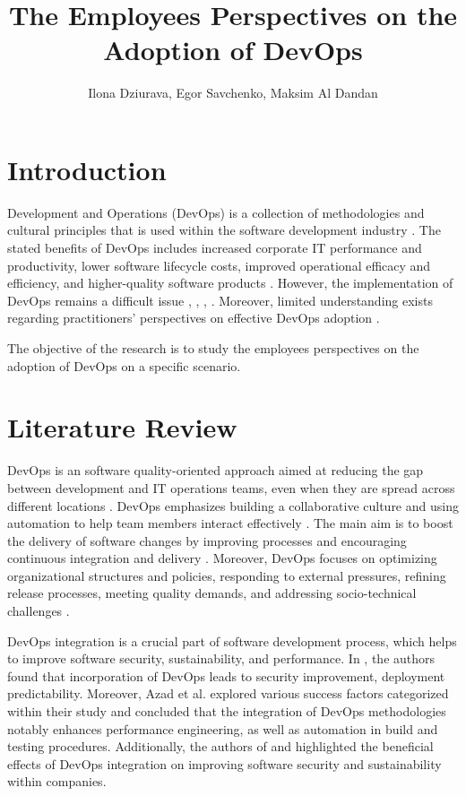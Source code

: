 \documentclass[oneside,final,12pt,a4paper]{extreport}
\title{The Employees Perspectives on the Adoption of DevOps}
\author{Ilona Dziurava, Egor Savchenko, Maksim Al Dandan}
\affil{Innopolis University}
\begin{document}
\maketitle

\newpage


\section{Introduction}

Development and Operations (DevOps) is a collection of methodologies and cultural principles that is used within the software development industry \cite{int1}. The stated benefits of DevOps includes increased corporate IT performance and productivity, lower software lifecycle costs, improved operational efficacy and efficiency, and higher-quality software products \cite{int1}. However, the implementation of DevOps remains a difficult issue \cite{int2}, \cite{8}, \cite{20}, \cite{14}. Moreover, limited understanding exists regarding practitioners' perspectives on effective DevOps adoption \cite{10}.

The objective of the research is to study the employees perspectives on the adoption of DevOps on a specific scenario.

\section{Literature Review}

DevOps is an software quality-oriented approach aimed at reducing the gap between development and IT operations teams, even when they are spread across different locations \cite{17}. DevOps emphasizes building a collaborative culture and using automation to help team members interact effectively \cite{7}. The main aim is to boost the delivery of software changes by improving processes and encouraging continuous integration and delivery \cite{11}. Moreover, DevOps focuses on optimizing organizational structures and policies, responding to external pressures, refining release processes, meeting quality demands, and addressing socio-technical challenges \cite{7}.

DevOps integration is a crucial part of software development process, which helps to improve software security, sustainability, and performance. In \cite{7}, the authors found that incorporation of DevOps leads to security improvement, deployment predictability. Moreover, Azad et al. \cite{9} explored various success factors categorized within their study and concluded that the integration of DevOps methodologies notably enhances performance engineering, as well as automation in build and testing procedures. Additionally, the authors of \cite{12} and \cite{18} highlighted the beneficial effects of DevOps integration on improving software security and sustainability within companies. 
\end{document}

